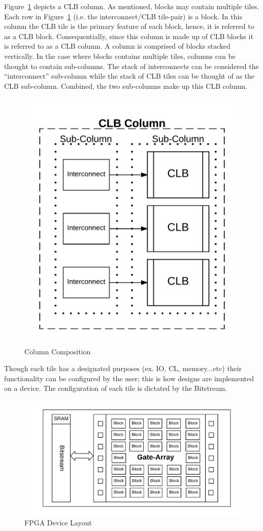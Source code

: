 Figure~\ref{fig:column} depicts a \acrfull{CLB} column.
As mentioned, blocks may contain multiple tiles.
Each row in Figure~\ref{fig:column} (i.e. the interconnect/\acrshort{CLB} tile-pair) is a block. 
In this column the \acrshort{CLB} tile is the primary feature of each block, hence, it is referred to as a \acrshort{CLB} block.
Consequentially, since this column is made up of \acrshort{CLB} blocks it is referred to as a \acrshort{CLB} column.
A column is comprised of blocks stacked vertically.
In the case where blocks contains multiple tiles, columns can be thought to contain sub-columns.
The stack of interconnects can be considered the ``interconnect'' sub-column while the stack of \acrshort{CLB} tiles can be thought of as the \acrshort{CLB} sub-column.
Combined, the two sub-columns make up this \acrshort{CLB} column. 
\begin{figure}
\centering
\includegraphics[width=0.7\linewidth]{Figures/column}
\caption[Column Composition]{Column Composition}
\label{fig:column}
\end{figure}
Though each tile has a designated purposes (ex. \acrfull{IO}, \acrfull{CL}, memory...etc) their functionality can be configured by the user; this is how designs are implemented on a device.
The configuration of each tile is dictated by the \gls{Bitstream}. 
\begin{figure}[h]
	\centering
	\includegraphics[width=0.9\linewidth]{Figures/architecture}
	\caption[FPGA Device Layout]{FPGA Device Layout}
	\label{fig:architecture}
\end{figure}

